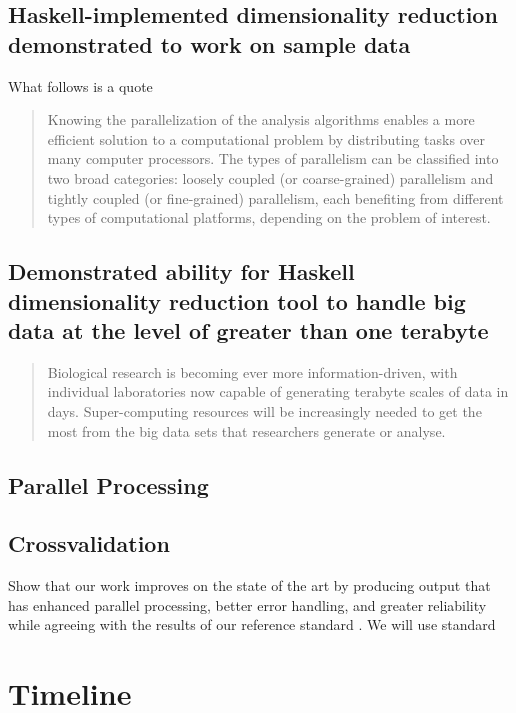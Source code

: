 \documentclass[11pt,letterpaper]{article}
\begin{document}
\subsection{Haskell-implemented dimensionality reduction demonstrated to work on sample data}
What follows is a quote
\begin{quotation}
Knowing the parallelization of the analysis algorithms enables a more efficient solution to a computational problem by distributing tasks over many computer processors. The types of parallelism can be classified into two broad categories: loosely coupled (or coarse-grained) parallelism and tightly coupled (or fine-grained) parallelism, each benefiting from different types of computational platforms, depending on the problem of interest.  
\end{quotation}

\subsection{Demonstrated ability for Haskell dimensionality reduction tool to handle big data at the level of greater than one terabyte}

\begin{quotation}
  Biological research is becoming ever more information-driven, with individual laboratories now capable of generating terabyte scales of data in days. Super-computing resources will be increasingly needed to get the most from the big data sets that researchers generate or analyse. 
\end{quotation}

\subsection{Parallel Processing}


\subsection{Crossvalidation}

Show that our work improves on the state of the art by producing output that has enhanced parallel processing, better error handling, and greater reliability while agreeing with the results of our reference standard \parencite{vieth2019systematic}. We will use standard 


\section{Timeline}
\end{document}

